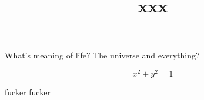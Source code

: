 \documentclass{article}
\title{xxx}
\begin{document}
\maketitle


What's meaning of life? The universe and everything?

$$x^2+y^2=1$$

\cite{Shum2018}
fucker
\cite{Li2021}
fucker

\end{document}
